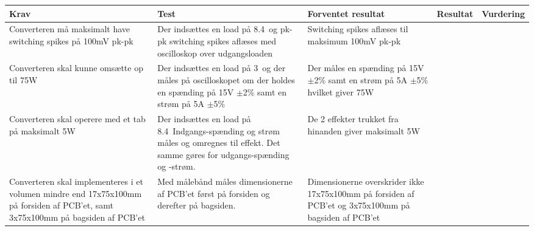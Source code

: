 \begin{tabularx}{\textwidth}{|X|X|X|X|X|}
	\hline
	\textbf{Krav} & \textbf{Test} & \textbf{Forventet resultat} & \textbf{Resultat} & \textbf{Vurdering} \\ \hline
	Converteren må maksimalt have switching spikes på 100mV pk-pk & Der indsættes en load på 8.4\ohm\ og pk-pk switching spikes aflæses med oscilloskop over udgangsloaden & Switching spikes aflæses til maksimum 100mV pk-pk && \\ \hline
	Converteren skal kunne omsætte op til 75W & Der indsættes en load på 3\ohm\ og der måles på oscilloskopet om der holdes en spænding på 15V $\pm$2\% samt en strøm på 5A $\pm$5\% & Der måles en spænding på 15V $\pm$2\% samt en strøm på 5A $\pm$5\% hvilket giver 75W && \\ \hline
	Converteren skal operere med et tab på maksimalt 5W & Der indsættes en load på 8.4\ohm\ Indgangs-spænding og strøm måles og omregnes til effekt. Det samme gøres for udgangs-spænding og -strøm. & De 2 effekter trukket fra hinanden giver maksimalt 5W && \\ \hline 
	Converteren skal implementeres i et volumen mindre end 17x75x100mm på forsiden af PCB'et, samt 3x75x100mm på bagsiden af PCB'et & Med målebånd måles dimensionerne af PCB'et først på forsiden og derefter på bagsiden. & Dimensionerne overskrider ikke 17x75x100mm på forsiden af PCB'et og 3x75x100mm på bagsiden af PCB'et && \\ \hline

\end{tabularx}



